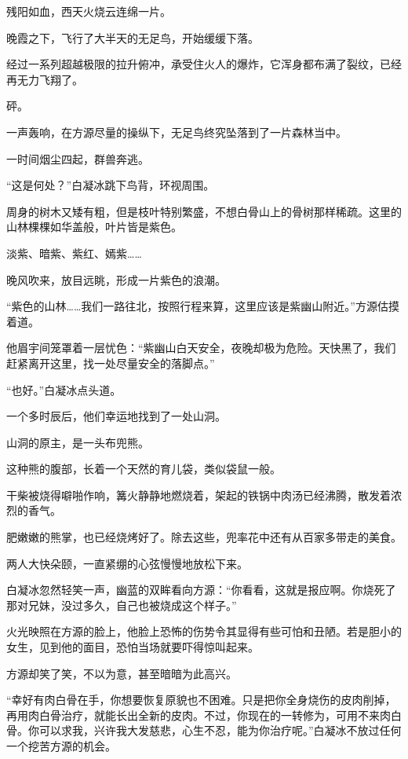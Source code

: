
\begin{this_body}

残阳如血，西天火烧云连绵一片。

晚霞之下，飞行了大半天的无足鸟，开始缓缓下落。

经过一系列超越极限的拉升俯冲，承受住火人的爆炸，它浑身都布满了裂纹，已经再无力飞翔了。

砰。

一声轰响，在方源尽量的操纵下，无足鸟终究坠落到了一片森林当中。

一时间烟尘四起，群兽奔逃。

“这是何处？”白凝冰跳下鸟背，环视周围。

周身的树木又矮有粗，但是枝叶特别繁盛，不想白骨山上的骨树那样稀疏。这里的山林棵棵如华盖般，叶片皆是紫色。

淡紫、暗紫、紫红、嫣紫……

晚风吹来，放目远眺，形成一片紫色的浪潮。

“紫色的山林……我们一路往北，按照行程来算，这里应该是紫幽山附近。”方源估摸着道。

他眉宇间笼罩着一层忧色：“紫幽山白天安全，夜晚却极为危险。天快黑了，我们赶紧离开这里，找一处尽量安全的落脚点。”

“也好。”白凝冰点头道。

一个多时辰后，他们幸运地找到了一处山洞。

山洞的原主，是一头布兜熊。

这种熊的腹部，长着一个天然的育儿袋，类似袋鼠一般。

干柴被烧得噼啪作响，篝火静静地燃烧着，架起的铁锅中肉汤已经沸腾，散发着浓烈的香气。

肥嫩嫩的熊掌，也已经烧烤好了。除去这些，兜率花中还有从百家多带走的美食。

两人大快朵颐，一直紧绷的心弦慢慢地放松下来。

白凝冰忽然轻笑一声，幽蓝的双眸看向方源：“你看看，这就是报应啊。你烧死了那对兄妹，没过多久，自己也被烧成这个样子。”

火光映照在方源的脸上，他脸上恐怖的伤势令其显得有些可怕和丑陋。若是胆小的女生，见到他的面目，恐怕当场就要吓得惊叫起来。

方源却笑了笑，不以为意，甚至暗暗为此高兴。

“幸好有肉白骨在手，你想要恢复原貌也不困难。只是把你全身烧伤的皮肉削掉，再用肉白骨治疗，就能长出全新的皮肉。不过，你现在的一转修为，可用不来肉白骨。你可以求我，兴许我大发慈悲，心生不忍，能为你治疗呢。”白凝冰不放过任何一个挖苦方源的机会。


\end{this_body}
